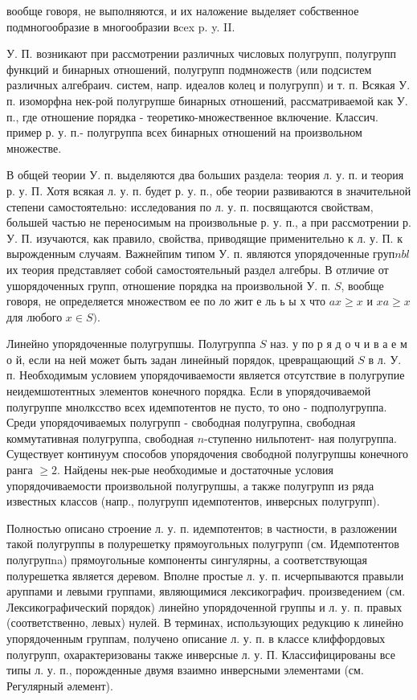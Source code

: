 \documentclass[10pt]{article}
\begin{document}
вообще говоря, не выполняются, и их наложение выделяет собственное подмногообразие в многообразии вcex p. y. II.



У. П. возникают при рассмотрении различных числовых полугрупп, полугрупп функций и бинарных отношений, полугрупп подмножеств (или подсистем различных алгебраич. систем, напр. идеалов колец и полугрупп) и т. п. Всякая У. п. изоморфна нек-рой полугрупше бинарных отношений, рассматриваемой как У. п., где отношение порядка - теоретико-множественное включение. Классич. пример р. у. п.- полугруппа всех бинарных отношений на произвольном множестве.



В общей теории У. п. выделяются два больших раздела: теория л. у. п. и теория р. у. П. Хотя всякая л. у. п. будет р. у. п., обе теории развиваются в значительной степени самостоятельно: исследования по л. у. п. посвящаются свойствам, большей частью не переносимым на произвольные р. у. п., а при рассмотрении р. У. П. изучаются, как правило, свойства, приводящие применительно к л. у. П. к вырожденным случаям. Важнейпим типом У. п. являются упорядоченные груп$n b l$ их теория представляет собой самостоятельный раздел алгебры. В отличие от ушорядоченных групп, отношение порядка на произвольной $\mathbf{У}$. п. $S$, вообще говоря, не определяется множеством ее по ло жит е ль ь ы х что $a x \geqslant x$ и $x a \geqslant x$ для любого $x \in S)$.



Линейно упорядоченные полугрупшы. Полугруппа $S$ наз. у по р я д о ч и в а е м о й, если на ней может быть задан линеӥный порядок, цревращающий $S$ в л. У. п. Необходимым условием упорядочиваемости является отсутствие в полугрупие неидемшотентных элементов конечного порядка. Если в упорядочиваемой полугруппе мнолксство всех идемпотентов не пусто, то оно - подполугруппа. Среди упорядочиваемых полугрупп - свободная полугрупна, свободная коммутативная полугруппа, свободная $n$-ступенно нильпотент- ная полугруппа. Существует континуум способов упорядочения свободной полугрупшы конечного ранга $\geqslant 2$. Найдены нек-рые необходимые и достаточные условия упорядочиваемости произвольной полугрупшы, а также полугрупп из ряда известных классов (напр., полугрупп идемпотентов, инверсных полугрупп).



Полностью описано строение л. у. п. идемпотентов; в частности, в разложении такой полугруппы в полурешетку прямоугольных полугрупп (см. Идемпотентов полугрупna) прямоугольные компоненты сингулярны, а соответствующая полурешетка является деревом. Вполне простые л. у. п. исчерпываются правыли аруппами и левыми группами, являющимися лексикографич. произведением (см. Лексикографический порядок) линейно упорядоченной группы и л. у. п. правых (соответственно, левых) нулей. В терминах, использующих редукцию к линейно упорядоченным группам, получено описание л. у. п. в классе клиффордовых полугрупп, охарактеризованы также инверсные л. у. П. Классифицированы все типы л. у. п., порожденные двумя взаимно инверсными элементами (см. Регулярный әлемент).
\end{document}

